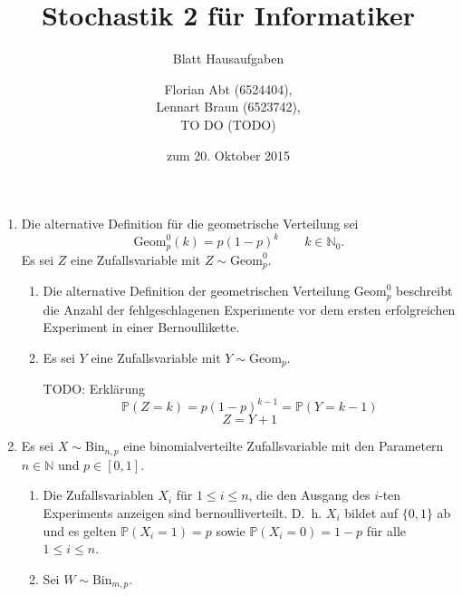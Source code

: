\documentclass[a4paper]{scrartcl}
\title{Stochastik 2 für Informatiker}
\subtitle{Blatt \blattnr Hausaufgaben}
\author{
    Florian Abt (6524404), \\
    Lennart Braun (6523742), \\
    TO DO (TODO)
}
\date{zum 20. Oktober 2015}
\newcommand{\prob}{\mathbb{P}}
\begin{document}
\maketitle

\begin{enumerate}[label=\bfseries 1.\arabic*]
    \item
        Die alternative Definition für die geometrische Verteilung sei
        \begin{equation*}
            \text{Geom}_p^0(k) = p(1-p)^k \qquad k \in \mathbb{N}_0 \text{.}
        \end{equation*}
        Es sei $Z$ eine Zufallsvariable mit $Z \sim \text{Geom}_p^0$.
        \begin{enumerate}[label=\alph*)]
            \item
                Die alternative Definition der geometrischen Verteilung
                $\text{Geom}_p^0$ beschreibt die Anzahl der fehlgeschlagenen
                Experimente vor dem ersten erfolgreichen Experiment in einer
                Bernoullikette.

            \item
                Es sei $Y$ eine Zufallsvariable mit $Y \sim \text{Geom}_p$.

                TODO: Erklärung
                \begin{equation*}
                    \prob(Z=k) = p(1-p)^{k-1} = \prob(Y=k-1)
                \end{equation*}
                \begin{equation*}
                    Z = Y + 1
                \end{equation*}

        \end{enumerate}

    \item
        Es sei $X \sim \text{Bin}_{n,p}$ eine binomialverteilte Zufallsvariable
        mit den Parametern $n \in \mathbb{N}$ und $p \in [0,1]$.
        \begin{enumerate}[label=\alph*)]
            \item
                Die Zufallsvariablen $X_i$ für $1 \leq i \leq n$, die den
                Ausgang des $i$-ten Experiments anzeigen sind
                bernoulliverteilt.  D.~h. $X_i$ bildet auf $\{0,1\}$ ab und es
                gelten $\prob(X_i=1) = p$ sowie $\prob(X_i=0) = 1-p$
                für alle $1 \leq i \leq n$.

            \item
                Sei $W \sim \text{Bin}_{m,p}$.


\end{enumerate}
\end{enumerate}
\end{document}
